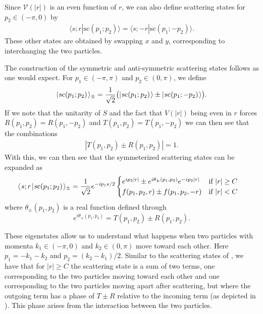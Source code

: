 \documentclass[../thesis-main/thesis-main]{subfiles}
\begin{document}

Since $\mathcal{V}(|r|)$ is an even function of $r$, we can also define scattering states for $p_2\in (-\pi,0)$ by
\begin{align}
\langle s;r|\mathrm{sc}(p_1;p_2)\rangle=\langle s;-r|\mathrm{sc}(p_1;-p_2)\rangle.
\end{align}
These other states are obtained by swapping $x$ and $y$, corresponding to interchanging the two particles.

The construction of the symmetric and anti-symmetric scattering states follows as one would expect. For $p_1\in (-\pi,\pi)$ and $p_2\in (0,\pi)$, we define
\begin{align}
  |\mspace{2mu} \mathrm{sc}(p_1;p_2) \mspace{2mu} \rangle_\pm = \frac{1}{\sqrt2}\big(|\mspace{2mu} \mathrm{sc}(p_1;p_2) \mspace{2mu} \rangle \pm |\mspace{2mu} \mathrm{sc}(p_1;-p_2) \mspace{2mu} \rangle\big).
\end{align}
If we note that the unitarity of $S$ and the fact that $V(|r|)$ being even in $r$ forces $R(p_1,p_2) = R(p_1,-p_2)$ and $T(p_1,p_2)  = T(p_1,-p_2)$ we can then see that the combinations
\begin{align}
  |T(p_1,p_2) \pm R(p_1,p_2)| = 1.  
\end{align}
With this, we can then see that the symmeterized scattering states can be expanded as
\begin{align}
    \langle\mspace{2mu} s;r \mspace{2mu} | \mspace{2mu} \mathrm{sc}(p_1;p_2)\mspace{2mu} \rangle_\pm
      &= \frac{1}{\sqrt{2}}e^{-i p_1 s/2} \begin{cases}  e^{i p_2 |r|} \pm e^{i\theta_{\pm}(p_1,p_2)} e^{-i p_2 |r|} &  \text{if } |r| \geq C\\
  	f(p_1,p_2,r) \pm f(p_1,p_2,-r) & \text{if }  |r| < C\end{cases}
\label{eq:symscatter}
\end{align}
where $\theta_{\pm}(p_1,p_2)$ is a real function defined through
\begin{equation}
e^{i\theta_{\pm}(p_1,p_2)}= T(p_1,p_2)\pm R(p_1,p_2). \label{eq:delta_pm}
\end{equation}


These eigenstates allow us to understand what happens when two particles with momenta $k_1\in(-\pi,0)$ and $k_2\in(0,\pi)$ move toward each other. Here $p_1=-k_1-k_2$ and $p_2=(k_2-k_1)/2$.  Similar to the scattering states of , we have that for $|r|\geq C$ the scattering state is a sum of two terms, one corresponding to the two particles moving toward each other and one corresponding to the two particles moving apart after scattering, but where the outgoing term has a  phase of $T\pm R$ relative to the incoming term (as depicted in ). This phase arises from the interaction between the two particles.
\end{document}
